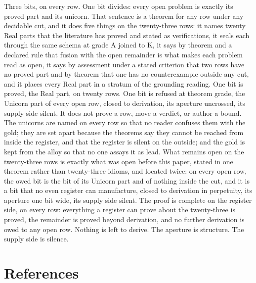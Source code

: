 \documentclass[10pt,twocolumn]{article}
\begin{document}
Three bits, on every row. One bit divides: every open problem is exactly
its proved part and its unicorn. That sentence is a theorem for any row
under any decidable cut, and it does five things on the twenty-three
rows: it names twenty Real parts that the literature has proved and
stated as verifications, it seals each through the same schema at grade
A joined to K, it says by theorem and a declared rule that fusion with
the open remainder is what makes each problem read as open, it says by
assessment under a stated criterion that two rows have no proved part
and by theorem that one has no counterexample outside any cut, and it
places every Real part in a stratum of the grounding reading. One bit is
proved, the Real part, on twenty rows. One bit is refused at theorem
grade, the Unicorn part of every open row, closed to derivation, its
aperture uncrossed, its supply side silent. It does not prove a row,
move a verdict, or author a bound. The unicorns are named on every row
so that no reader confuses them with the gold; they are set apart
because the theorems say they cannot be reached from inside the
register, and that the register is silent on the outside; and the gold
is kept from the alloy so that no one assays it as lead. What remains
open on the twenty-three rows is exactly what was open before this
paper, stated in one theorem rather than twenty-three idioms, and
located twice: on every open row, the owed bit is the bit of its Unicorn
part and of nothing inside the cut, and it is a bit that no even
register can manufacture, closed to derivation in perpetuity, its
aperture one bit wide, its supply side silent. The proof is complete on
the register side, on every row: everything a register can prove about
the twenty-three is proved, the remainder is proved beyond derivation,
and no further derivation is owed to any open row. Nothing is left to
derive. The aperture is structure. The supply side is silence.

\hypertarget{references}{%
\section{References}\label{references}}
\end{document}
